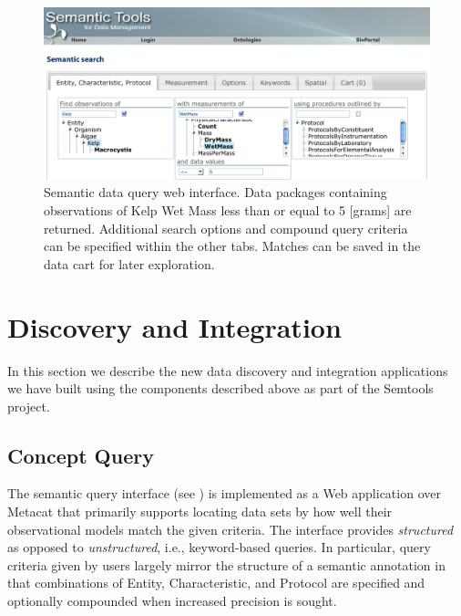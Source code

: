 \begin{figure}[!t]
\centering
\includegraphics[width=1.0\textwidth]{images/metacat-query.png}
\caption{Semantic data query web interface. Data packages containing observations of Kelp Wet Mass less than or equal to 5 [grams] are returned. Additional search options and compound query criteria can be specified within the other tabs. Matches can be saved in the data cart for later exploration.}
\label{fig:metacat-query}
\end{figure}


\section{Discovery and Integration}
\label{sec:application}

In this section we describe the new data discovery and integration
applications we have built using the components described above as
part of the Semtools project.

\subsection{Concept Query} 

The semantic query interface (see ) is
implemented as a Web application over Metacat that primarily supports
locating data sets by how well their observational models match the
given criteria. The interface provides \emph{structured} as opposed to
\emph{unstructured}, i.e., keyword-based queries. In particular, query
criteria given by users largely mirror the structure of a semantic
annotation in that combinations of Entity, Characteristic, and
Protocol are specified and optionally compounded when increased
precision is sought.

